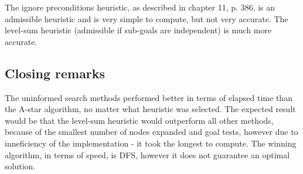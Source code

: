 \documentclass[12pt, a4paper]{article}
\begin{document}
The ignore preconditions heuristic, as described in \cite{russell1995modern} chapter 11, p. 386,
is an admissible heuristic and is very simple to compute, but not very accurate.
The level-sum heuristic (admissible if sub-goals are independent) is much more accurate.


\subsection{Closing remarks}

The uninformed search methods performed better in terms of elapsed time than the A-star
algorithm, no matter what heuristic was selected. The expected result would be that
the level-sum heuristic would outperform all other methods, because of the smallest number
of nodes expanded and goal tests, however due to inneficiency of the implementation - it took
the longest to compute. The winning algorithm, in terms of speed, is DFS, however it does not guarantee
an optimal solution.

\printbibliography
\end{document}
